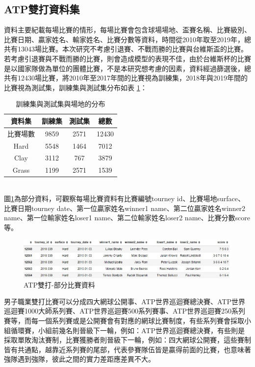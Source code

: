 \documentclass[12pt]{article}
\begin{document}
\subsection{ATP雙打資料集}
資料主要紀載每場比賽的情形，每場比賽會包含球場場地、盃賽名稱、比賽級別、比賽日期、贏家姓名、輸家姓名、比賽分數等資料，時間從2010年取至2019年，總共有13043場比賽。本次研究不考慮引退賽、不戰而勝的比賽與台維斯盃的比賽。若考慮引退賽與不戰而勝的比賽，則會造成模型的表現不佳，由於台維斯杯的比賽是以國家隊做為單位的團體比賽，不是本研究想考慮的因素，資料經過篩選後，總共有12430場比賽，將2010年至2017年間的比賽視為訓練集，2018年與2019年間的比賽視為測試集，訓練集與測試集分布如表 \ref{tab:dataset}：
\begin{table}[!h]
\caption{訓練集與測試集與場地的分布}
\centering
\begin{tabular}[center]{cccc}
\hline
資料集 & 訓練集 & 測試集 & 總數\\
\hline
比賽場數 & 9859 & 2571 & 12430\\
\hline
Hard & 5548 & 1464 & 7012\\
Clay & 3112 & 767 & 3879 \\
Grass & 1199 & 2571 & 1539 \\
\hline
\end{tabular}

\label{tab:dataset}
\end{table}
\\
圖\ref{fig:double}為部分資料，可觀察每場比賽資料有比賽編號tourney id、比賽場地surface、比賽日期tourney date、第一位贏家姓名winner1 name、第二位贏家姓名winner2 name、第一位輸家姓名loser1 name、第二位輸家姓名loser2 name、比賽分數score等。
\begin{figure}[!h]
\includegraphics[width=400pt]{image/dataset.jpg}
\caption{ATP雙打-部分比賽資料}
\label{fig:double}
\end{figure}

男子職業雙打比賽可以分成四大網球公開事、ATP世界巡迴賽總決賽、ATP世界巡迴賽1000大師系列賽、ATP世界巡迴賽500系列賽事、ATP世界巡迴賽250系列賽等，而每一個系列賽或是公開賽會有對應的網球比賽制度，有些系列賽會採取小組循環賽，小組前幾名則晉級下一輪，例如：ATP世界巡迴賽總決賽，有些則是採取單敗淘汰賽制，比賽獲勝者則晉級下一輪，例如：四大網球公開賽，這些賽制皆有共通點，越靠近系列賽的尾部，代表參賽隊伍皆是贏得前面的比賽，也意味著強隊遇到強隊，彼此之間的實力差距應差異不大。
\end{document}
